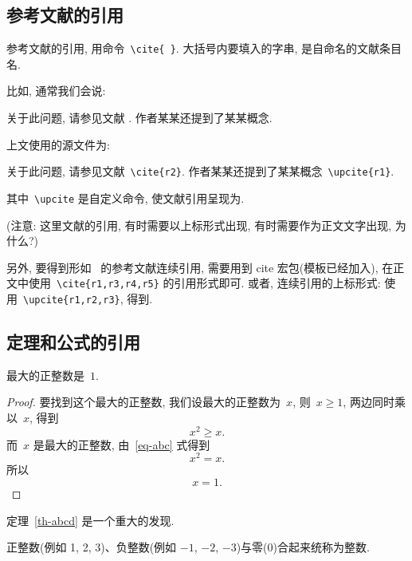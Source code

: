 \documentclass{WHUMaster}   %
\begin{document}
\subsection{参考文献的引用}

参考文献的引用, 用命令~\verb|\cite{ }|. 大括号内要填入的字串, 是自命名的文献条目名.

比如, 通常我们会说:

 {\kaishu
关于此问题, 请参见文献 \cite{r2}. 作者某某还提到了某某概念.}


上文使用的源文件为:

 {\kaishu
关于此问题, 请参见文献~\verb|\cite{r2}|. 作者某某还提到了某某概念~\verb|\upcite{r1}|.
}

其中~\verb|\upcite| 是自定义命令, 使文献引用呈现为.

({\heiti 注意:} {\kaishu 这里文献的引用, 有时需要以上标形式出现, 有时需要作为正文文字出现, 为什么?})

另外, 要得到形如~\cite{r1,r3,r4,r5} 的参考文献连续引用, 需要用到 cite 宏包(模板已经加入),
在正文中使用~\verb|\cite{r1,r3,r4,r5}| 的引用形式即可.
或者, 连续引用的上标形式: 使用~\verb|\upcite{r1,r2,r3}|, 得到.

\subsection{定理和公式的引用}

\begin{theorem}[谁发现的]\label{th-abcd}
最大的正整数是~$1$.
\end{theorem}

\begin{proof}
要找到这个最大的正整数, 我们设最大的正整数为~$x$, 则~$x \geqslant 1$, 两边同时乘以~$x$, 得到
\begin{equation}\label{eq-abc}
x^2 \geqslant x.
\end{equation}
而~$x$ 是最大的正整数, 由~\eqref{eq-abc} 式得到
\[
x^2 = x.
\]
所以
\begin{equation*}
x = 1.
\end{equation*}
\end{proof}

定理~\ref{th-abcd} 是一个重大的发现.

\begin{definition}[整数]
 正整数(例如 1, 2, 3)、负整数(例如 ${−1}$, $−2$, $−3$)与零(0)合起来统称为{\heiti 整数}.
\end{definition}
\end{document}
